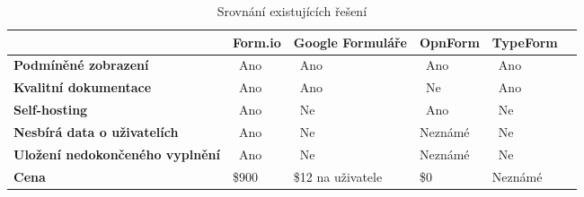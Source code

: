 \newcommand{\yes}{\tikzcmark\ Ano}
\newcommand{\no}{\tikzxmark\ Ne}

\begin{table}[h!]
    \centering
    \begin{tabularx}{\textwidth}{
        | >{\centering\arraybackslash}X
        | >{\centering\arraybackslash}X
        | >{\centering\arraybackslash}X
        | >{\centering\arraybackslash}X
        | >{\centering\arraybackslash}X
        | >{\centering\arraybackslash}X |
    }
        \hline
        & \textbf{Form.io} & \textbf{Google Formuláře} & \textbf{OpnForm} & \textbf{TypeForm} \\
        \hline
        \textbf{Podmíněné zobrazení}            & \yes             & \yes                      & \yes             & \yes              \\
        \hline
        \textbf{Kvalitní dokumentace}           & \yes             & \yes                      & \no              & \yes              \\
        \hline
        \textbf{Self-hosting}                   & \yes             & \no                       & \yes             & \no               \\
        \hline
        \textbf{Nesbírá data o uživatelích}     & \yes             & \no                       & Neznámé          & \no               \\
        \hline
        \textbf{Uložení nedokončeného vyplnění} & \yes             & \no                       & Neznámé          & \no               \\
        \hline
        \textbf{Cena}                           & \$900            & \$12 na uživatele         & \$0              & Neznámé           \\
        \hline
    \end{tabularx}
    \caption{Srovnání existujících řešení}
    \label{tab:srovnani-existujicich-reseni}
\end{table}
